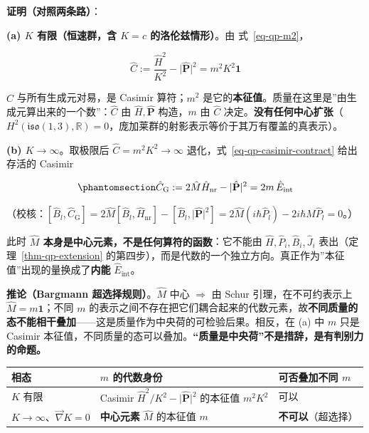 \documentclass[
  chinese,
  a4paper,
  UTF8,
  12pt,
  oneside,
  openany]{ctexbook}
\newcounter{none} %
\theoremstyle{plain}
\theoremstyle{plain}
\theoremstyle{plain}
\theoremstyle{definition}
\theoremstyle{plain}
\theoremstyle{plain}
\theoremstyle{remark}
\begin{document}
\textbf{证明（对照两条路）}：

\textbf{(a) \(K\) 有限（恒速群，含 \(K=c\) 的洛伦兹情形）}。由
式~\ref{eq-qp-m2}，

\[
\hat C:=\frac{\hat H^{2}}{K^{2}}-\lvert\hat{\mathbf P}\rvert^{2}=m^{2}K^{2}\mathbf 1
\]

\(\hat C\) 与所有生成元对易，是 Casimir 算符；\(m^{2}\)
是它的\textbf{本征值}。质量在这里是''由生成元算出来的一个数''：\(\hat C\)
由 \(\hat H,\hat{\mathbf P}\) 构造，\(m\) 由 \(\hat C\)
决定。\textbf{没有任何中心扩张}（\(H^{2}(\mathfrak{iso}(1,3),\mathbb R)=0\)，庞加莱群的射影表示等价于其万有覆盖的真表示）。

\textbf{(b) \(K\to\infty\)}。取极限后 \(\hat C=m^{2}K^{2}\to\infty\)
退化，式~\ref{eq-qp-casimir-contract} 给出存活的 Casimir

\begin{equation}\protect\phantomsection\label{eq-qp-casimirG}{
\hat C_{\text{G}}:=2\hat M\hat H_{\text{nr}}-\lvert\hat{\mathbf P}\rvert^{2}=2m\,\hat E_{\text{int}}
}\end{equation}

（校核：\([\hat B_l,\hat C_{\text{G}}]=2\hat M[\hat B_l,\hat H_{\text{nr}}]-[\hat B_l,\lvert\hat{\mathbf P}\rvert^{2}]=2\hat M(i\hbar\hat P_l)-2i\hbar\hat M\hat P_l=0\)。）

此时 \textbf{\(\hat M\) 本身是中心元素，不是任何算符的函数}：它不能由
\(\hat H,\hat P_i,\hat B_i,\hat J_i\) 表出（定理~\ref{thm-qp-extension}
的第四步），而是代数的一个独立方向。真正作为''本征值''出现的量换成了\textbf{内能}
\(\hat E_{\text{int}}\)。

\textbf{推论（Bargmann 超选择规则）}。\(\hat M\) 中心 \(\Rightarrow\) 由
Schur 引理，在不可约表示上 \(\hat M=m\mathbf 1\)；不同 \(m\)
的表示之间不存在把它们耦合起来的代数元素，故\textbf{不同质量的态不能相干叠加}------这是质量作为中央荷的可检验后果。相反，在
(a) 中 \(m\) 只是 Casimir
本征值，不同质量的态可以叠加。\textbf{``质量是中央荷''不是措辞，是有判别力的命题。}

{\def\LTcaptype{none} %
\begin{longtable}[]{@{}
  >{\raggedright\arraybackslash}p{}
  >{\raggedright\arraybackslash}p{}
  >{\raggedright\arraybackslash}p{}@{}}
\toprule\noalign{}
\begin{minipage}[b]{\linewidth}\raggedright
相态
\end{minipage} & \begin{minipage}[b]{\linewidth}\raggedright
\(m\) 的代数身份
\end{minipage} & \begin{minipage}[b]{\linewidth}\raggedright
可否叠加不同 \(m\)
\end{minipage} \\
\midrule\noalign{}
\endhead
\bottomrule\noalign{}
\endlastfoot
\(K\) 有限 & Casimir
\(\hat H^{2}/K^{2}-\lvert\hat{\mathbf P}\rvert^{2}\) 的本征值
\(m^{2}K^{2}\) & 可以 \\
\(K\to\infty\)、\(\vec\nabla K=0\) & \textbf{中心元素} \(\hat M\)
的本征值 \(m\) & \textbf{不可以}（超选择） \\
\end{longtable}
}
\end{document}
